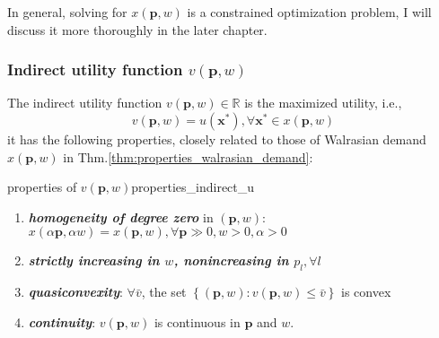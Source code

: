 In general, solving for $ x(\mathbf{p},w)$ is a constrained optimization problem, I will discuss it more thoroughly in the later chapter.

\subsubsection*{Indirect utility function $v(\mathbf{p},w)$}
The indirect utility function $v(\mathbf{p},w)\in \mathbb{R}$ is the maximized utility, i.e., 
$$v(\mathbf{p},w)=u(\mathbf{x}^*),\forall \mathbf{x}^*\in  x(\mathbf{p},w)$$
it has the following properties, closely related to those of Walrasian demand $ x(\mathbf{p},w)$ in Thm.\ref{thm:properties_walrasian_demand}:

\begin{theorem}{properties of $v(\mathbf{p},w)$}{properties_indirect_u}
    \begin{enumerate}
        \item \textit{\textbf{homogeneity of degree zero}} in $(\mathbf{p},w)$: $ x(\alpha\mathbf{p},\alpha w)= x(\mathbf{p},w),\forall \mathbf{p}\gg 0,w>0,\alpha>0$
        \item \textit{\textbf{strictly increasing in $w$, nonincreasing in $p_l,\forall l$}}
        \item \textit{\textbf{quasiconvexity}}: $\forall \bar{v}$, the set $\left\{(\mathbf{p},w):v(\mathbf{p},w)\leq \bar{v}\right\}$ is convex
        \item \textit{\textbf{continuity}}: $v(\mathbf{p},w)$ is continuous in $\mathbf{p}$ and $w$.
    \end{enumerate}
\end{theorem}

